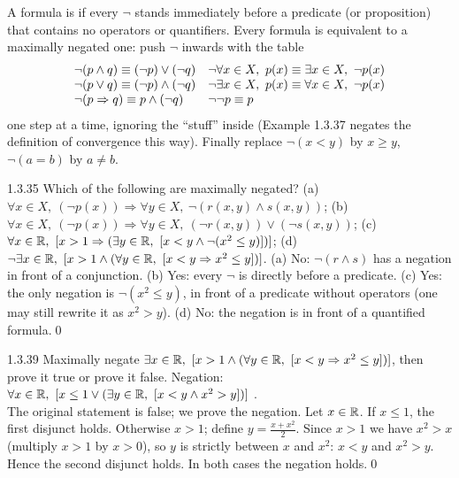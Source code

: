 \begin{key}
A formula is  if every $\neg$ stands immediately before a predicate (or proposition) that contains no operators or quantifiers. Every formula is equivalent to a maximally negated one: push $\neg$ inwards with the table
\[
\begin{array}{l@{\quad}l}
\neg(p\wedge q)\equiv(\neg p)\vee(\neg q) & \neg\forall x\in X,\ p(x)\equiv\exists x\in X,\ \neg p(x)\\
\neg(p\vee q)\equiv(\neg p)\wedge(\neg q) & \neg\exists x\in X,\ p(x)\equiv\forall x\in X,\ \neg p(x)\\
\neg(p\Rightarrow q)\equiv p\wedge(\neg q) & \neg\neg p\equiv p
\end{array}
\]
one step at a time, ignoring the ``stuff'' inside (Example 1.3.37 negates the definition of convergence this way). Finally replace $\neg(x<y)$ by $x\ge y$, $\neg(a=b)$ by $a\ne b$.
\end{key}

\begin{bookex}[recommended]{1.3.35}
Which of the following are maximally negated? (a) $\forall x\in X,\ (\neg p(x))\Rightarrow\forall y\in X,\ \neg(r(x,y)\wedge s(x,y))$; (b) $\forall x\in X,\ (\neg p(x))\Rightarrow\forall y\in X,\ (\neg r(x,y))\vee(\neg s(x,y))$; (c) $\forall x\in\R,\ [x>1\Rightarrow(\exists y\in\R,\ [x<y\wedge\neg(x^2\le y)])]$; (d) $\neg\exists x\in\R,\ [x>1\wedge(\forall y\in\R,\ [x<y\Rightarrow x^2\le y])]$.
\solution
(a) No: $\neg(r\wedge s)$ has a negation in front of a conjunction. (b) Yes: every $\neg$ is directly before a predicate. (c) Yes: the only negation is $\neg(x^2\le y)$, in front of a predicate without operators (one may still rewrite it as $x^2>y$). (d) No: the negation is in front of a quantified formula.\qed
\end{bookex}

\begin{bookex}{1.3.39}
Maximally negate $\exists x\in\R,\ [x>1\wedge(\forall y\in\R,\ [x<y\Rightarrow x^2\le y])]$, then prove it true or prove it false.
\solution
Negation: $\forall x\in\R,\ [x\le1\vee(\exists y\in\R,\ [x<y\wedge x^2>y])]$ .\\
The original statement is false; we prove the negation. Let $x\in\mathbb{R}$. If $x\le1$, the first disjunct holds. Otherwise $x>1$; define $y=\frac{x+x^2}2$. Since $x>1$ we have $x^2>x$ (multiply $x>1$ by $x>0$), so $y$ is strictly between $x$ and $x^2$: $x<y$ and $x^2>y$. Hence the second disjunct holds. In both cases the negation holds.\qed
\end{bookex}

